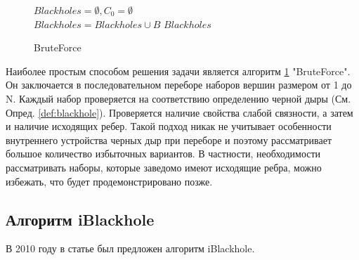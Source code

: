 \documentclass[12pt,a4paper,oneside,openany]{article}
\theoremstyle{definition}
\theoremstyle{lemma}
\theoremstyle{remark}
\begin{document}
\linespread{1.0}
\begin{figure}[H]
	\begin{center}
		\begin{algorithm}[H]
			\SetAlgoLined

                        $Blackholes = \emptyset, C_0 = \emptyset$ \\
                         {
                             {
                                 {
                                     {
                                        $Blackholes = Blackholes \cup B$
                                    }
                                }
                            }
                        }
                        \Return $Blackholes$
			\label{alg:bruteforce}
			\caption{BruteForce}
		\end{algorithm}
	\end{center}
\end{figure}
\linespread{1.5}

Наиболее простым способом решения задачи является алгоритм \ref{alg:bruteforce} "BruteForce".
Он заключается в последовательном переборе наборов вершин размером от 1 до N.
Каждый набор проверяется на соответствию определению черной дыры (См. Опред. \ref{def:blackhole}).
Проверяется наличие свойства слабой связности, а затем и наличие исходящих ребер.
Такой подход никак не учитывает особенности внутреннего устройства черных дыр при переборе и поэтому рассматривает большое количество избыточных вариантов.
В частности, необходимости рассматривать наборы, которые заведомо имеют исходящие ребра, можно избежать, что будет продемонстрировано позже.

\subsection{Алгоритм iBlackhole}\label{subsec:iblackhole}

В 2010 году в статье \cite{li2010detecting} был предложен алгоритм iBlackhole.
\end{document}
